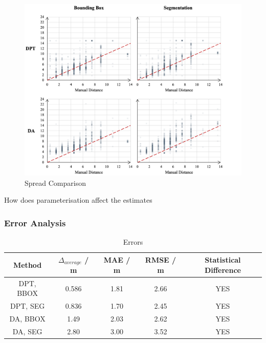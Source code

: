 \begin{figure}[htbp]
    \centering
    \includegraphics[width=1.01\textwidth]{body/analysis/assets/distance_graphs/spread}
    \caption{Spread Comparison}
    \label{fig:spread_comparison}
\end{figure}

How does parameterisation affect the estimates

\clearpage

\subsubsection{Error Analysis}

\begin{table}[htbp]
    \centering
    \caption{Errors}
    \label{tab:distances}
    \begin{tabular}{ccccc}
        \textbf{Method} & \textbf{$\Delta_{average}$ / m} & \textbf{MAE / m} & \textbf{RMSE / m}
        & \textbf{Statistical Difference} \\
        \midrule
        DPT, BBOX & 0.586 & 1.81 & 2.66 & YES \\
        DPT, SEG  & 0.836 & 1.70 & 2.45 & YES \\
        DA, BBOX  & 1.49  & 2.03 & 2.62 & YES \\
        DA, SEG   & 2.80  & 3.00 & 3.52 & YES \\
    \end{tabular}
\end{table}

\clearpage

